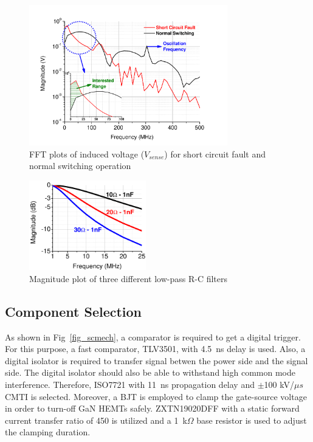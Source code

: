 \documentclass[journal]{IEEEtran}
\begin{document}
\begin{figure}[!t]
\centering
\includegraphics[width=3.4in]{Figures/Fig9-FFT_DPTvsSC.pdf}
\caption{FFT plots of induced voltage ($V_{sense}$) for short circuit fault and normal switching operation}
\label{fig_FFT_DPTvsSCP}
\end{figure}

\begin{figure}[!t]
\centering
\includegraphics[width=2in]{Figures/Fig10-RC_FilterBode.pdf}
\caption{Magnitude plot of three different low-pass R-C filters}
\label{fig_RCFilter}
\end{figure}

\subsection{Component Selection}

As shown in Fig~\ref{fig_scmech}, a comparator is required to get a digital trigger. For this purpose, a fast comparator, TLV3501, with 4.5~ns delay is used. Also, a digital isolator is required to transfer signal betwen the power side and the signal side. The digital isolator should also be able to withstand high common mode interference. Therefore, ISO7721 with 11~ns propagation delay and $\pm$100 kV/$\mu s$ CMTI is selected. Moreover, a BJT is employed to clamp the gate-source voltage in order to turn-off GaN HEMTs safely. ZXTN19020DFF with a static forward current transfer ratio of 450 is utilized and a 1~k$\Omega$ base resistor is used to adjust the clamping duration.
\end{document}
